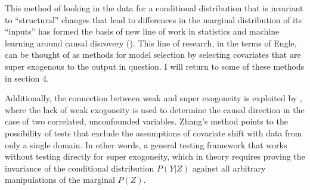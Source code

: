 \documentclass[a4paper,12pt]{article}
\begin{document}
This method of looking in the data for a conditional distribution that is invariant to ``structural'' changes that lead to differences in the marginal distribution of its ``inputs'' has formed the basis of new line of work in statistics and machine learning around causal discovery (\cite{Peters2015, Heinze-deml2017, Rojas-carulla2018}). This line of research, in the terms of Engle, can be thought of as methods for model selection by selecting covariates that are super exogenous to the output in question. I will return to some of these methods in section 4.

Additionally, the connection between weak and super exogoneity is exploited by \cite{Zhang2015}, where the lack of weak exogoneity is used to determine the causal direction in the case of two correlated, unconfounded variables. Zhang's method points to the possibility of tests that exclude the assumptions of covariate shift with data from only a single domain. In other words, a general testing framework that works without testing directly for super exogoneity, which in theory requires proving the invariance of the conditional distribution $P(Y|Z)$ against all arbitrary manipulations of the marginal $P(Z)$.




\end{document}
